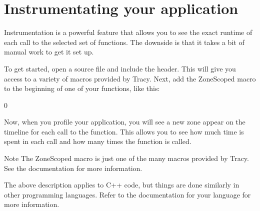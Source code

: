 \chapter{Instrumentating your application }
\hypertarget{md__mono_engine_2thirdparty_2tracy_2profiler_2src_2achievements_2_instrumentation_intro}{}\label{md__mono_engine_2thirdparty_2tracy_2profiler_2src_2achievements_2_instrumentation_intro}
\label{md__mono_engine_2thirdparty_2tracy_2profiler_2src_2achievements_2_instrumentation_intro_autotoc_md1108}%
%


Instrumentation is a powerful feature that allows you to see the exact runtime of each call to the selected set of functions. The downside is that it takes a bit of manual work to get it set up.

To get started, open a source file and include the {\ttfamily {}} header. This will give you access to a variety of macros provided by Tracy. Next, add the {\ttfamily Zone\+Scoped} macro to the beginning of one of your functions, like this:\+


\begin{DoxyCode}{0}
\DoxyCodeLine{}
\DoxyCodeLine{\{}
\DoxyCodeLine{\ \ \ \ \textcolor{comment}{//\ Your\ code\ here}}
\DoxyCodeLine{\}}

\end{DoxyCode}


Now, when you profile your application, you will see a new zone appear on the timeline for each call to the function. This allows you to see how much time is spent in each call and how many times the function is called.

\begin{DoxyNote}{Note}
The {\ttfamily Zone\+Scoped} macro is just one of the many macros provided by Tracy. See the documentation for more information.
\end{DoxyNote}
The above description applies to C++ code, but things are done similarly in other programming languages. Refer to the documentation for your language for more information. 